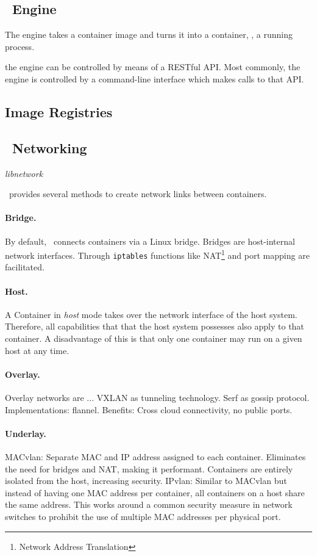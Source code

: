 \subsection{\docker\ Engine}
The engine takes a container image and turns it into a container, \ie , a running process.

the engine can be controlled by means of a RESTful API. Most commonly, the engine is controlled by a command-line interface which makes calls to that API.

\subsection{Image Registries}

\subsection{\docker\ Networking}



\emph{libnetwork}

\docker\ provides several methods to create network links between containers.  



\paragraph{Bridge.} By default, \docker\ connects containers via a Linux bridge. Bridges are host-internal network interfaces. Through \texttt{iptables} functions like NAT\footnote{Network Address Translation} and port mapping are facilitated.

\paragraph{Host.} A Container in \emph{host} mode takes over the network interface of the host system. Therefore, all capabilities that that the host system possesses also apply to that container. A disadvantage of this is that only one container may run on a given host at any time.

\paragraph{Overlay.} 
Overlay networks \cite{tarkoma2010overlay} are ...
VXLAN as tunneling technology.
Serf as gossip protocol.
Implementations: flannel.
Benefits: Cross cloud connectivity, no public ports.

\paragraph{Underlay.}
MACvlan: Separate MAC and IP address assigned to each container. Eliminates the need for bridges and NAT, making it performant. Containers are entirely isolated from the host, increasing security.
IPvlan: Similar to MACvlan but instead of having one MAC address per container, all containers on a host share the same address. This works around a common security measure in network switches to prohibit the use of multiple MAC addresses per physical port.
